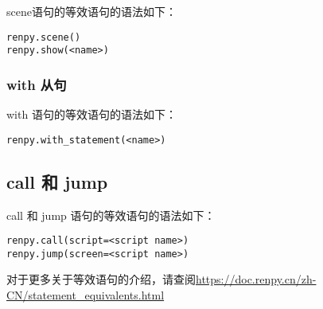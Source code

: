 scene语句的等效语句的语法如下：

\begin{lstlisting}
renpy.scene()
renpy.show(<name>)
\end{lstlisting}

\subsubsection{with 从句}

with 语句的等效语句的语法如下：

\begin{lstlisting}
renpy.with_statement(<name>)
\end{lstlisting}

\subsection{call 和 jump}

call 和 jump 语句的等效语句的语法如下：

\begin{lstlisting}
renpy.call(script=<script name>)
renpy.jump(screen=<script name>)
\end{lstlisting}

对于更多关于等效语句的介绍，请查阅\url{https://doc.renpy.cn/zh-CN/statement_equivalents.html}